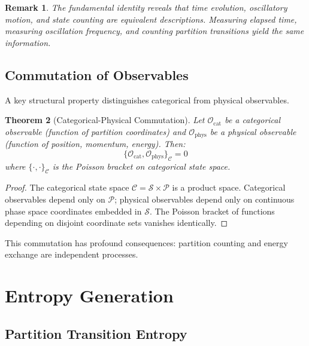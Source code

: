 \documentclass[twocolumn,10pt]{article}
\newtheorem{theorem}{Theorem}[section]
\newtheorem{remark}[theorem]{Remark}
\begin{document}
\begin{remark}
The fundamental identity reveals that time evolution, oscillatory motion, and state counting are equivalent descriptions. Measuring elapsed time, measuring oscillation frequency, and counting partition transitions yield the same information.
\end{remark}

\subsection{Commutation of Observables}

A key structural property distinguishes categorical from physical observables.

\begin{theorem}[Categorical-Physical Commutation]
\label{thm:commutation}
Let $\mathcal{O}_{\mathrm{cat}}$ be a categorical observable (function of partition coordinates) and $\mathcal{O}_{\mathrm{phys}}$ be a physical observable (function of position, momentum, energy). Then:
\begin{equation}
    \{\mathcal{O}_{\mathrm{cat}}, \mathcal{O}_{\mathrm{phys}}\}_{\mathcal{C}} = 0
\end{equation}
where $\{\cdot, \cdot\}_{\mathcal{C}}$ is the Poisson bracket on categorical state space.
\end{theorem}

\begin{proof}
The categorical state space $\mathcal{C} = \mathcal{S} \times \mathcal{P}$ is a product space. Categorical observables depend only on $\mathcal{P}$; physical observables depend only on continuous phase space coordinates embedded in $\mathcal{S}$. The Poisson bracket of functions depending on disjoint coordinate sets vanishes identically.
\end{proof}

This commutation has profound consequences: partition counting and energy exchange are independent processes.



\section{Entropy Generation}
\label{sec:entropy}

\subsection{Partition Transition Entropy}
\end{document}

